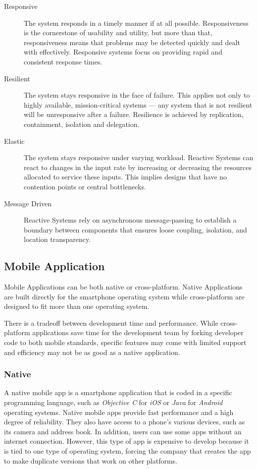 \begin{description}
	\item [Responsive] The system responds in a timely manner if at all possible. Responsiveness is the cornerstone of usability and utility, but more than that, responsiveness means that problems may be detected quickly and dealt with effectively. Responsive systems focus on providing rapid and consistent response times.
	\item [Resilient] The system stays responsive in the face of failure. This applies not only to highly available, mission-critical systems — any system that is not resilient will be unresponsive after a failure. Resilience is achieved by replication, containment, isolation and delegation.
	\item [Elastic] The system stays responsive under varying workload. Reactive Systems can react to changes in the input rate by increasing or decreasing the resources allocated to service these inputs. This implies designs that have no contention points or central bottlenecks.
	\item [Message Driven] Reactive Systems rely on asynchronous message-passing to establish a boundary between components that ensures loose coupling, isolation, and location transparency.
\end{description}

\subsection{Mobile Application}
\label{subsec:state_mobile_app}

Mobile Applications can be both native or cross-platform. Native Applications are built directly for the smartphone operating system while cross-platform are designed to fit more than one operating system.

There is a tradeoff between development time and performance. While cross-platform applications save time for the development team by forking developer code to both mobile standards, specific features may come with limited support and efficiency may not be as good as a native application.

\subsubsection{Native}

A native mobile app is a smartphone application that is coded in a specific programming language, such as \emph{Objective C} for \emph{iOS} or \emph{Java} for \emph{Android} operating systems. Native mobile apps provide fast performance and a high degree of reliability. They also have access to a phone's various devices, such as its camera and address book. In addition, users can use some apps without an internet connection. However, this type of app is expensive to develop because it is tied to one type of operating system, forcing the company that creates the app to make duplicate versions that work on other platforms.

